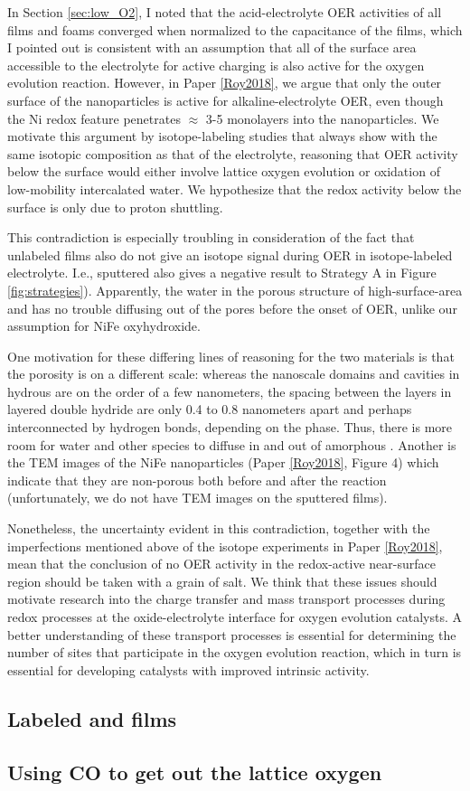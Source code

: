 In Section \ref{sec:low_O2}, I noted that the acid-electrolyte OER activities of all  films and  foams converged when normalized to the capacitance of the films, which I pointed out is consistent with an assumption that all of the surface area accessible to the electrolyte for active charging is also active for the oxygen evolution reaction. However, in Paper \ref{Roy2018}, we argue that only the outer surface of the nanoparticles is active for alkaline-electrolyte OER, even though the Ni redox feature penetrates $\approx$ 3-5 monolayers into the nanoparticles. We motivate this argument by isotope-labeling studies that always show  with the same isotopic composition as that of the electrolyte, reasoning that OER activity below the surface would either involve lattice oxygen evolution or oxidation of low-mobility intercalated water. We hypothesize that the redox activity below the surface is only due to proton shuttling.

This contradiction is especially troubling in consideration of the fact that unlabeled  films also do not give an isotope signal during OER in isotope-labeled electrolyte. I.e., sputtered  also gives a negative result to Strategy A in Figure \ref{fig:strategies}). Apparently, the water in the porous structure of high-surface-area  and  has no trouble diffusing out of the pores before the onset of OER, unlike our assumption for NiFe oxyhydroxide.

One motivation for these differing lines of reasoning for the two materials is that the porosity is on a different scale: whereas the nanoscale domains and cavities in hydrous  are on the order of a few nanometers\cite{Yoshida2013}, the spacing between the layers in  layered double hydride are only 0.4 to 0.8 nanometers apart and perhaps interconnected by hydrogen bonds, depending on the phase\cite{Dionigi2016b}. Thus, there is more room for water and other species to diffuse in and out of amorphous . Another is the TEM images of the NiFe nanoparticles (Paper \ref{Roy2018}, Figure 4) which indicate that they are non-porous both before and after the reaction (unfortunately, we do not have TEM images on the sputtered  films).

Nonetheless, the uncertainty evident in this contradiction, together with the imperfections mentioned above of the isotope experiments in Paper \ref{Roy2018}, mean that the conclusion of no OER activity in the redox-active near-surface region should be taken with a grain of salt. We think that these issues should motivate research into the charge transfer and mass transport processes during redox processes at the oxide-electrolyte interface for oxygen evolution catalysts. A better understanding of these transport processes is essential for determining the number of sites that participate in the oxygen evolution reaction, which in turn is essential for developing catalysts with improved intrinsic activity\cite{Kibsgaard2019}. 



\subsection{Labeled  and  films}

\subsection{Using CO to get out the lattice oxygen}